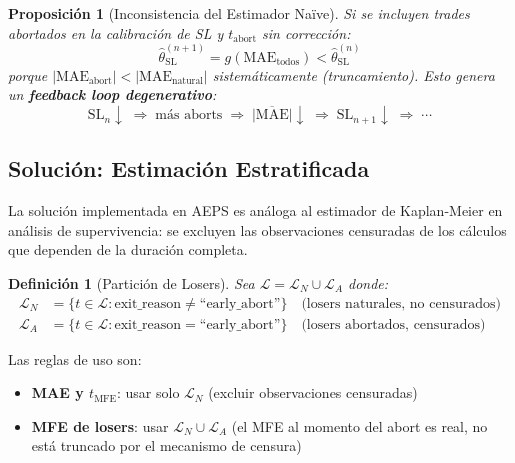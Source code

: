 \documentclass[11pt,a4paper]{article}
\newtheorem{definition}{Definici\'on}[section]
\newtheorem{proposition}{Proposici\'on}[section]
\begin{document}
\begin{proposition}[Inconsistencia del Estimador Na\"ive]
\label{prop:inconsistency}
Si se incluyen trades abortados en la calibraci\'on de SL y
$t_{\text{abort}}$ sin correcci\'on:
\begin{equation}
\hat{\theta}_{\text{SL}}^{(n+1)} = g\!\left(\text{MAE}_{\text{todos}}\right)
  < \hat{\theta}_{\text{SL}}^{(n)}
\end{equation}
porque $|\text{MAE}_{\text{abort}}| < |\text{MAE}_{\text{natural}}|$
sistem\'aticamente (truncamiento). Esto genera un \textbf{feedback
loop degenerativo}:
\begin{equation}
\text{SL}_{n} \downarrow \;\Rightarrow\;
\text{m\'as aborts} \;\Rightarrow\;
\overline{|\text{MAE}|} \downarrow \;\Rightarrow\;
\text{SL}_{n+1} \downarrow \;\Rightarrow\; \cdots
\label{eq:feedback}
\end{equation}
\end{proposition}

\subsection{Soluci\'on: Estimaci\'on Estratificada}

La soluci\'on implementada en AEPS es an\'aloga al estimador de
Kaplan-Meier \cite{kaplan1958nonparametric} en an\'alisis de
supervivencia: se excluyen las observaciones censuradas de los
c\'alculos que dependen de la duraci\'on completa.

\begin{definition}[Partici\'on de Losers]
\label{def:partition}
Sea $\mathcal{L} = \mathcal{L}_N \cup \mathcal{L}_A$ donde:
\begin{align}
\mathcal{L}_N &= \{t \in \mathcal{L} : \text{exit\_reason} \neq \text{``early\_abort''}\}
  \quad \text{(losers naturales, no censurados)} \\
\mathcal{L}_A &= \{t \in \mathcal{L} : \text{exit\_reason} = \text{``early\_abort''}\}
  \quad \text{(losers abortados, censurados)}
\end{align}
\end{definition}

Las reglas de uso son:
\begin{itemize}[leftmargin=1.5em]
\item \textbf{MAE y $t_{\text{MFE}}$}: usar solo $\mathcal{L}_N$
  (excluir observaciones censuradas)
\item \textbf{MFE de losers}: usar $\mathcal{L}_N \cup \mathcal{L}_A$
  (el MFE al momento del abort es real, no est\'a truncado por el
  mecanismo de censura)
\end{itemize}
\end{document}
